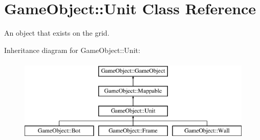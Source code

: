 \hypertarget{classGameObject_1_1Unit}{
\section{GameObject::Unit Class Reference}
\label{classGameObject_1_1Unit}
}


An object that exists on the grid.  


Inheritance diagram for GameObject::Unit:\begin{figure}[H]
\begin{center}
\leavevmode
\includegraphics[height=4cm]{classGameObject_1_1Unit}
\end{center}
\end{figure}

